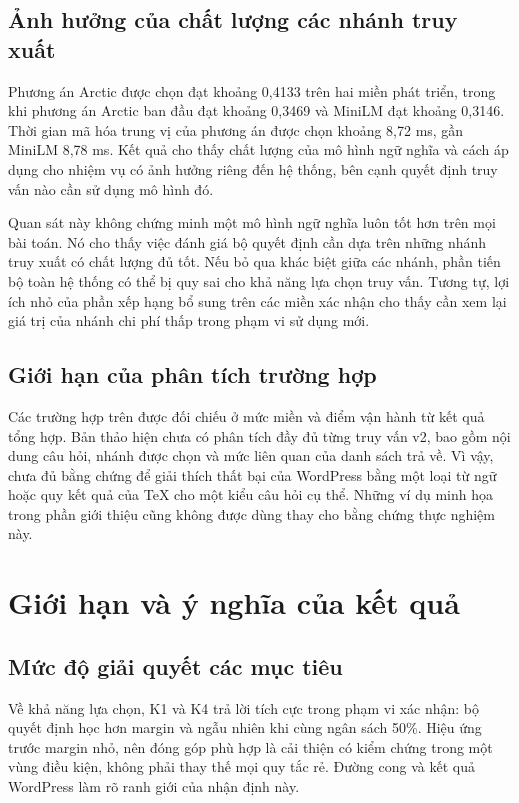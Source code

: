 \subsection{Ảnh hưởng của chất lượng các nhánh truy xuất}
\begin{table}[htbp]
\centering\small
\caption{Các phương án mô hình ngữ nghĩa được xem xét trên Programmers và Unix. Thời gian mã hóa thuộc phép đánh giá mô hình, không phải toàn bộ thời gian trả kết quả cho một truy vấn.}
\label{tab:encoder}

\end{table}

Phương án Arctic được chọn đạt \Hstar{} khoảng 0,4133 trên hai miền phát triển, trong khi phương án Arctic ban đầu đạt khoảng 0,3469 và MiniLM đạt khoảng 0,3146. Thời gian mã hóa trung vị của phương án được chọn khoảng 8,72 ms, gần MiniLM 8,78 ms. Kết quả cho thấy chất lượng của mô hình ngữ nghĩa và cách áp dụng cho nhiệm vụ có ảnh hưởng riêng đến hệ thống, bên cạnh quyết định truy vấn nào cần sử dụng mô hình đó.

Quan sát này không chứng minh một mô hình ngữ nghĩa luôn tốt hơn trên mọi bài toán. Nó cho thấy việc đánh giá bộ quyết định cần dựa trên những nhánh truy xuất có chất lượng đủ tốt. Nếu bỏ qua khác biệt giữa các nhánh, phần tiến bộ toàn hệ thống có thể bị quy sai cho khả năng lựa chọn truy vấn. Tương tự, lợi ích nhỏ của phần xếp hạng bổ sung trên các miền xác nhận cho thấy cần xem lại giá trị của nhánh chi phí thấp trong phạm vi sử dụng mới.

\subsection{Giới hạn của phân tích trường hợp}
Các trường hợp trên được đối chiếu ở mức miền và điểm vận hành từ kết quả tổng hợp. Bản thảo hiện chưa có phân tích đầy đủ từng truy vấn v2, bao gồm nội dung câu hỏi, nhánh được chọn và mức liên quan của danh sách trả về. Vì vậy, chưa đủ bằng chứng để giải thích thất bại của WordPress bằng một loại từ ngữ hoặc quy kết quả của TeX cho một kiểu câu hỏi cụ thể. Những ví dụ minh họa trong phần giới thiệu cũng không được dùng thay cho bằng chứng thực nghiệm này.

\section{Giới hạn và ý nghĩa của kết quả}
\subsection{Mức độ giải quyết các mục tiêu}
Về khả năng lựa chọn, K1 và K4 trả lời tích cực trong phạm vi xác nhận: bộ quyết định học hơn margin và ngẫu nhiên khi cùng ngân sách 50\%. Hiệu ứng trước margin nhỏ, nên đóng góp phù hợp là cải thiện có kiểm chứng trong một vùng điều kiện, không phải thay thế mọi quy tắc rẻ. Đường cong và kết quả WordPress làm rõ ranh giới của nhận định này.


